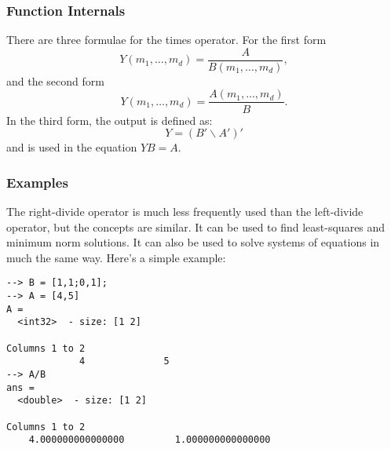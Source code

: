 \subsubsection{Function Internals}
There are three formulae for the times operator.  For the first form
\[
Y(m_1,\ldots,m_d) = \frac{A}{B(m_1,\ldots,m_d)},
\]
and the second form
\[
Y(m_1,\ldots,m_d) = \frac{A(m_1,\ldots,m_d)}{B}.
\]
In the third form, the output is defined as:
\[
  Y = (B' \backslash A')'
\]
and is used in the equation $Y B = A$.
\subsubsection{Examples}
The right-divide operator is much less frequently used than the left-divide operator, but the concepts are similar.  It can be used to find least-squares and minimum norm solutions.  It can also be used to solve systems of equations in much the same way.  Here's a simple example:
\begin{verbatim}
--> B = [1,1;0,1];
--> A = [4,5]
A =
  <int32>  - size: [1 2]
  
Columns 1 to 2
             4              5
--> A/B
ans =
  <double>  - size: [1 2]
  
Columns 1 to 2
    4.000000000000000         1.000000000000000
\end{verbatim}
